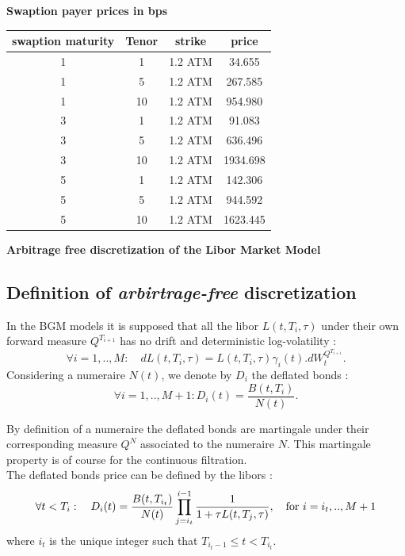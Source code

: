 \documentclass[10pt,a4paper,english,landscape]{slides}
\begin{document}
\begin{center}
{\bf Swaption payer prices in bps}\\
\begin{tabular}{|cccc|}\hline
{\small swaption maturity}  & Tenor     & strike      &   price   \\ \hline
  1      &  1    &    1.2 ATM   &    34.655 \\  
  1      &  5    &    1.2 ATM   &    267.585 \\
  1      &  10   &    1.2 ATM   &    954.980  \\
  3      &  1    &    1.2 ATM   &    91.083 \\  
  3      &  5    &    1.2 ATM   &    636.496 \\
  3      &  10   &    1.2 ATM   &    1934.698  \\
  5      &  1    &    1.2 ATM   &    142.306  \\  
  5      &  5    &    1.2 ATM   &    944.592 \\
  5      &  10   &    1.2 ATM   &    1623.445  \\ \hline
\end{tabular} 
\end{center} 

\newpage

{\bf Arbitrage free discretization of the Libor Market Model}

\subsection{Definition of {\it arbirtrage-free} discretization}

In the BGM models it is supposed that all the libor $L(t,T_i,\tau)$ under their own forward measure $Q^{T_{i+1}}$  has no drift and 
deterministic log-volatility :
$$\forall i=1,..,M : \quad dL(t,T_i,\tau)=L(t,T_i,\tau)\gamma_i(t).dW^{Q^{T_{i+1}}}_t.$$
Considering a numeraire $N(t)$, we denote by $D_i$ the deflated bonds :
$$\forall i=1,..,M+1 : D_i(t)=\frac{B(t,T_i)}{N(t)}.$$

\noindent By definition of a numeraire the deflated bonds are martingale under their corresponding measure $Q^N$ associated to the numeraire $N$.
This martingale property is of course for the continuous filtration.\\
The deflated bonds price can be defined by the libors :
$$\forall t<T_i:\quad D_i(t)=\frac{B(t,T_{i_t})}{N(t)}\prod_{j=i_t}^{i-1}\frac{1}{1+\tau
    L(t,T_j,\tau)},\quad \hbox{for } i=i_t,..,M+1$$
where $i_t$ is the unique integer such that $T_{i_t-1} \le t
<T_{i_t}$.\\
\end{document}
